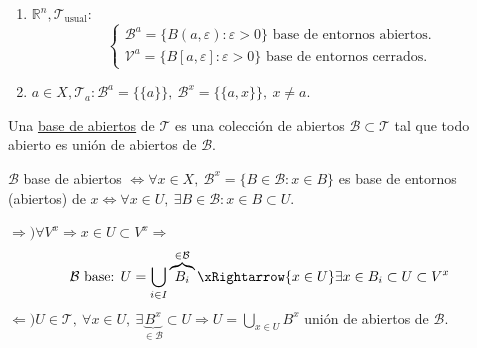 \begin{ej}
\begin{enumerate}
    \item $\mathbb{R}^n, \mathcal{T}_{\text{usual}}: $
    \[
    \begin{cases}
    \mathcal{B}^a = \{B\left( a, \varepsilon \right): \varepsilon > 0\} \text{ base de entornos abiertos.}  \\
    \mathcal{V}^a = \{B\left[ a, \varepsilon \right]: \varepsilon > 0\} \text{ base de entornos cerrados.} 
    \end{cases} 
    \]
    \item $a \in X, \mathcal{T}_a : \mathcal{B}^a = \{\{a\}\},\ \mathcal{B}^x = \{\{a, x\}\},\ x \neq a$.
\end{enumerate}
\end{ej}

\begin{defi}
Una \underline{base de abiertos} de $\mathcal{T}$ es una colección de abiertos $\mathcal{B} \subset \mathcal{T}$ tal que todo abierto es unión de abiertos de $\mathcal{B}$.
\end{defi}

\begin{prop}
$\mathcal{B}$ base de abiertos $\Leftrightarrow \forall x \in X,\ \mathcal{B}^x = \{B \in \mathcal{B} : x \in B\}$ es base de entornos (abiertos) de $x \Leftrightarrow \forall x \in U,\ \exists B \in \mathcal{B} : x \in B \subset U$.
\end{prop}
\begin{demo}
$\Rightarrow) \forall V^x \Rightarrow x \in U \subset V^x \Rightarrow$
\[
    \mathcal{B} \text{ base: } U = \bigcup_{i \in  I} \overbrace{B_i}^{\in \mathcal{B}} \xRightarrow{x \in U} \exists x \in B_i \subset U \subset V^x
\]
$\Leftarrow) U \in \mathcal{T},\ \forall x \in U,\ \exists \underbrace{B^x}_{\in \mathcal{B}} \subset U \Rightarrow U = \bigcup_{x \in U} B^x$ unión de abiertos de $\mathcal{B}$.
\end{demo}


